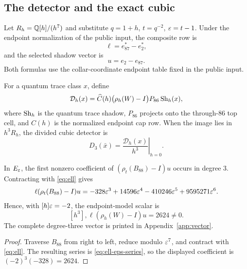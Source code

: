 \subsection{The detector and the exact cubic}

Let $R_h=\mathbb{Q}[h]/(h^7)$ and substitute $q=1+h$, $t=q^{-2}$, $\varepsilon=t-1$.
Under the endpoint normalization of the public input, the composite row is
\begin{equation}\label{eq:ell}
\ell=e_{87}^{*}-e_2^{*},
\end{equation}
and the selected shadow vector is
\begin{equation}\label{eq:u}
u=e_2-e_{87}.
\end{equation}
Both formulas use the collar-coordinate endpoint table fixed in the public
input.

\begin{definition}\label{def:detector}
For a quantum trace class $x$, define
\[
\mathcal D_h(x)=
\widehat C(h)\bigl(\rho_h(W)-I\bigr)P_{86}\operatorname{Sh}_h(x),
\]
where $\operatorname{Sh}_h$ is the quantum trace shadow, $P_{86}$ projects onto the
through-$86$ top cell, and $\widehat C(h)$ is the normalized endpoint cap
row.  When the image lies in $h^3R_h$, the divided cubic detector is
\begin{equation}\label{eq:D3}
D_3(\bar x)=\left.\frac{\mathcal D_h(x)}{h^3}\right|_{h=0}.
\end{equation}
\end{definition}

\begin{proposition}\label{prop:D3-vT}
In $E_\varepsilon$, the first nonzero coefficient of $(\rho_t(B_{88})-I)u$ occurs in
degree $3$.  Contracting with \eqref{eq:ell} gives
\begin{equation}\label{eq:ell-eps-series}
\ell(\rho_t(B_{88})-I)u
=-328\varepsilon^3+14596\varepsilon^4-410246\varepsilon^5+9595271\varepsilon^6.
\end{equation}
Hence, with $[h]\varepsilon=-2$, the endpoint-model scalar is
\begin{equation}\label{eq:D3-vT-value}
[h^3],\ell(\rho_h(W)-I)u=2624\ne0.
\end{equation}
The complete degree-three vector is printed in Appendix~\ref{app:vector}.
\end{proposition}

\begin{proof}
Traverse $B_{88}$ from right to left, reduce modulo $\varepsilon^7$, and contract
with \eqref{eq:ell}.  The resulting series is
\eqref{eq:ell-eps-series}, so the displayed coefficient is
$(-2)^3(-328)=2624$.
\end{proof}

